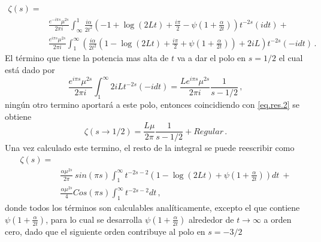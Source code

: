 \begin{align}\label{eq.zeta.logs}
    \zeta  (s) =& \\
     & \frac{e^{-i \pi s} \mu ^{2s}}{2 \pi i} \int _{\infty} ^{1}
     \frac{ i \alpha}{2 t^2}
     \left(
     - 1 +  \log (2 L t) + \frac{i \pi}{2}  - \psi \left( 1+\frac{\alpha}{2 t} \right)
     \right)
     t^{-2 s}
      \nonumber
     (i dt) + \\
     & \frac{e^{i \pi s} \mu ^{2s}}{2 \pi i} \int _1 ^{\infty}
	\left(      
     \frac{ i \alpha}{2  t^2}
     \left(
     1 -  \log (2 L t) + \frac{i \pi}{2} + \psi \left( 1 + \frac{\alpha}{2 t} \right)       
     \right)
     + 2 i L
     \right)
     t^{-2 s}
     (-i dt) \nonumber
     	\, .
\end{align}
El término que tiene la potencia mas alta de $t$ va a dar el polo en $s=1/2$ el cual está dado por
\begin{equation}
    \frac{e^{i \pi s} \mu ^{2s} }{2 \pi i }
    \int _1 ^{\infty}
    2 i L    
    t ^{-2 s}
    (-i dt) =  
    \frac{L e^{i \pi s} \mu ^{2s}}{2 \pi i} \frac{1}{s-1/2   }
    	\, ,
\end{equation}
ningún otro termino aportará a este polo, entonces coincidiendo con \ref{eq.res.2} se obtiene
\begin{equation}
    \zeta (s \rightarrow 1/2) = \frac{L \mu }{2 \pi} \frac{1}{s- 1/2 } + Regular
    	\, .
\end{equation}
Una vez calculado este termino, el resto de la integral se puede reescribir como
\begin{align}
	\zeta (s) =&  
		\nonumber \\[5pt]
    & \frac{\alpha \mu ^{2s} }{2 \pi} \ sin(\pi s)
    \int _1 ^{\infty}
    t ^{-2 s-2} 
    \left(
    1 -  \log (2Lt) + \psi \left( 1 + \frac{\alpha}{2t} \right)
    \right) dt \ + 
    	\nonumber \\[5pt]
    &
    \frac{\alpha \mu ^{2s} }{4} 
    Cos(\pi s)
    \int _1 ^{\infty} t^{-2s-2} dt
    	\, ,
\end{align}
donde todos los términos son calculables analíticamente, excepto el que contiene $\psi \left( 1 + \frac{\alpha}{2t} \right)$, para lo cual se desarrolla $\psi \left( 1 + \frac{\alpha}{2t} \right) $ alrededor de \mbox{$t \rightarrow \infty$} a orden cero, dado que el siguiente orden contribuye al polo en $s = -3/2$

